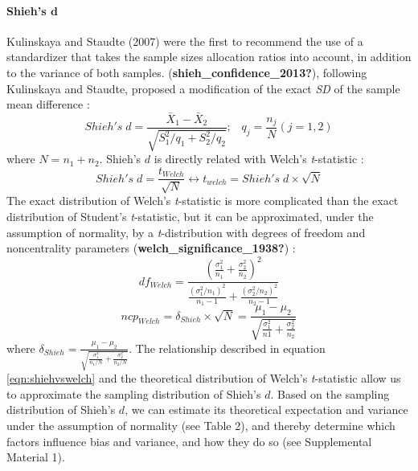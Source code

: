 \documentclass[
  english,
  man]{apa6}
\let\oldparagraph\paragraph
\renewcommand{\paragraph}[1]{\oldparagraph{#1}\mbox{}}
\begin{document}
\elandscape
\newpage

\hypertarget{shiehs-bmd}{%
\paragraph{\texorpdfstring{Shieh's \(\bm{d}\)}{Shieh's \textbackslash bm\{d\}}}\label{shiehs-bmd}}

Kulinskaya and Staudte (2007) were the first to recommend the use of a standardizer that takes the sample sizes allocation ratios into account, in addition to the variance of both samples. (\textbf{shieh\_confidence\_2013?}), following Kulinskaya and Staudte, proposed a modification of the exact \emph{SD} of the sample mean difference :
\begin{equation*} 
Shieh's \; d = \frac{\bar{X}_1 - \bar{X}_2}{\sqrt{S_1^2/q_1+S_2^2/q_2}}; \;\;\; q_j=\frac{n_j}{N} (j=1,2)
\label{eqn:Shiehds}
\end{equation*}
where \(N = n_1+n_2\). Shieh's \(d\) is directly related with Welch's \emph{t}-statistic :
\begin{equation} 
Shieh's \; d=\frac{t_{Welch}}{\sqrt{N}}\leftrightarrow t_{welch} = Shieh's \; d \times \sqrt{N}
\label{eqn:shiehvswelch}
\end{equation}
The exact distribution of Welch's \emph{t}-statistic is more complicated than the exact distribution of Student's \emph{t}-statistic, but it can be approximated, under the assumption of normality, by a \emph{t}-distribution with degrees of freedom and noncentrality parameters (\textbf{welch\_significance\_1938?}) :
\begin{equation} 
df_{Welch} = \frac{\left(\frac{\sigma^2_1}{n_1}+\frac{\sigma^2_2}{n_2} \right)^2}{\frac{(\sigma^2_1/n_1)^2}{n_1-1}+\frac{(\sigma^2_2/n_2)^2}{n_2-1}}
\label{eqn:welchdf}
\end{equation}
\begin{equation*} 
ncp_{Welch} = \delta_{Shieh} \times \sqrt{N} = \frac{\mu_1-\mu_2}{\sqrt{\frac{\sigma_1^2}{n1}+\frac{\sigma_2^2}{n_2}}}
\label{eqn:welchncp}
\end{equation*}
where \(\delta_{Shieh}=\frac{\mu_1-\mu_2}{\sqrt{\frac{\sigma_1^2}{n_1/N}+\frac{\sigma_2^2}{n_2/N}}}\). The relationship described in equation \ref{eqn:shiehvswelch} and the theoretical distribution of Welch's \emph{t}-statistic allow us to approximate the sampling distribution of Shieh's \(d\). Based on the sampling distribution of Shieh's \(d\), we can estimate its theoretical expectation and variance under the assumption of normality (see Table 2), and thereby determine which factors influence bias and variance, and how they do so (see Supplemental Material 1).
\end{document}
